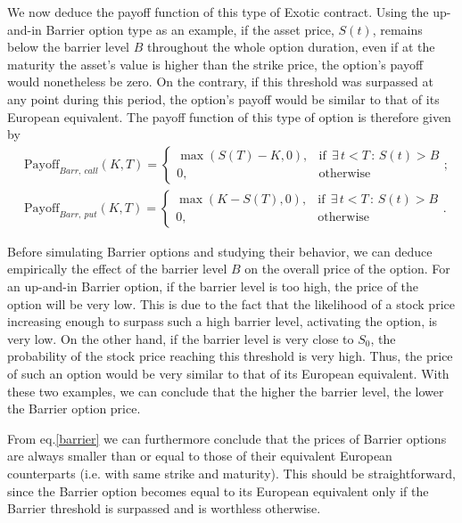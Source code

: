 We now deduce the payoff function of this type of Exotic contract. Using the up-and-in Barrier option type as an example, if the asset price, $S(t)$, remains below the barrier level $B$ throughout the whole option duration, even if at the maturity the asset's value is higher than the strike price, the option's payoff would nonetheless be zero. On the contrary, if this threshold was surpassed at any point during this period, the option's payoff would be similar to that of its European equivalent.
The payoff function of this type of option is therefore given by
\begin{subequations}\label{barrier}
\begin{align}
&\text{Payoff}_{Barr,\ call}(K,T)=\begin{cases} 
      \max\left(S(T)-K,0\right), & \mathrm{if}\ \ \exists\,t<T\,:\,S(t)>B\\
      0, & \mathrm{otherwise}
   \end{cases};\\
&\text{Payoff}_{Barr,\ put}(K,T)=\begin{cases} 
      \max\left(K-S(T),0\right), & \mathrm{if}\ \ \exists\,t<T\,:\,S(t)>B\\
      0, & \mathrm{otherwise}
   \end{cases}.
\end{align}
\end{subequations}


Before simulating Barrier options and studying their behavior, we can deduce empirically the effect of the barrier level $B$ on the overall price of the option. For an up-and-in Barrier option, if the barrier level is too high, the price of the option will be very low. This is due to the fact that the likelihood of a stock price increasing enough to surpass such a high barrier level, activating the option, is very low. On the other hand, if the barrier level is very close to $S_0$, the probability of the stock price reaching this threshold is very high. Thus, the price of such an option would be very similar to that of its European equivalent.
With these two examples, we can conclude that the higher the barrier level, the lower the Barrier option price.

From eq.\eqref{barrier} we can furthermore conclude that the prices of Barrier options are always smaller than or equal to those of their equivalent European counterparts (i.e. with same strike and maturity). This should be straightforward, since the Barrier option becomes equal to its European equivalent only if the Barrier threshold is surpassed and is worthless otherwise.




